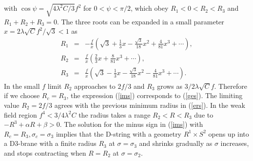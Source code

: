 \documentclass[12pt,a4paper]{article}
\newcommand{\la}{\lambda}
\newcommand{\al}{\alpha}
\begin{document}
with $\cos\psi = \sqrt{4\la^2C/3}f^2$ for $0< \psi <\pi/2$, which obey
$R_1 < 0 < R_2 < R_3$ and $R_1 + R_2 + R_3 = 0$. 
The three roots can be expanded in a small
parameter $x = 2\la\sqrt{C}f^2/\sqrt{3}<1$ as
\begin{eqnarray}
R_1 &=& - \frac{f}{x}(\sqrt{3} + \frac{1}{3}x - \frac{\sqrt{3}}{18}x^2
+ \frac{4}{81}x^3 + \cdots ), \nonumber \\
R_2 &=& \frac{f}{x} ( \frac{2}{3}x + \frac{8}{81}x^3 + \cdots ), \\
R_3 &=&  \frac{f}{x}(\sqrt{3} - \frac{1}{3}x - \frac{\sqrt{3}}{18}x^2
- \frac{4}{81}x^3 + \cdots ). \nonumber
\end{eqnarray}
In the small $f$ limit $R_2$ approaches to $2f/3$ and $R_3$ grows as
$3/2\la\sqrt{C}f$. Therefore if we choose $R_c = R_3$, the expression 
(\ref{ims}) corresponds to (\ref{ges}). The limiting value $R_2 = 2f/3$
agrees with the previous minimum radius in (\ref{ers}).
In the weak field region $f^4 < 3/4\la^2C$ the radius takes a range
$R_2<R<R_3$ due to $-R^3 + \al R + \beta > 0$. The solution
for the minus sign in (\ref{ims}) with $R_c = R_3, \sigma_c = \sigma_3$
implies that the D-string with a geometry $R^1 \times S^2$
opens up into a D3-brane with a finite radius
$R_3$ at $\sigma = \sigma_3$ and shrinks gradually as $\sigma$
increases, and stops contracting when $R = R_2$ at $\sigma = \sigma_2$.
\end{document}
